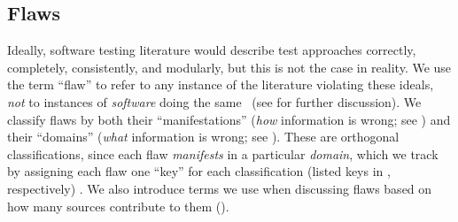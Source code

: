
\subsection{Flaws}\label{flaw-def}

Ideally, software testing literature would describe test approaches correctly,
completely, consistently, and modularly, but this is not the case in reality.
We use the term ``flaw'' to refer to any instance of the literature violating
these ideals, \emph{not} to instances of \emph{software} doing the same%
\ifnotpaper\ (see  for further discussion)\fi.
We classify flaws by both their ``manifestations'' (\emph{how} information is
wrong; see ) and their ``domains'' (\emph{what} information is
wrong; see ). These are orthogonal %
classifications, since each flaw \emph{manifests} in a particular
\emph{domain}, which we track by assigning each flaw one ``key'' for each
classification (listed keys in ,
respectively)%
. We also introduce terms we use when discussing flaws based on how many
sources contribute to them ().

